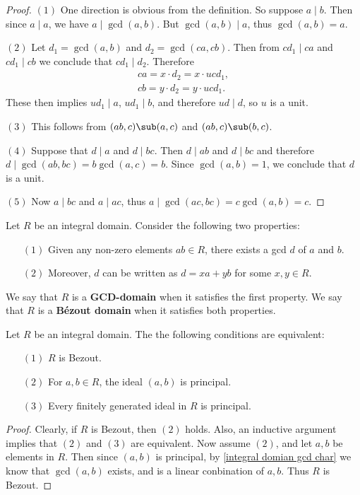 \begin{proof}
$(1)$ One direction is obvious from the definition. So suppose $a\mid b$. Then since $a\mid a$, we have $a\mid\gcd(a,b)$. But $\gcd(a,b)\mid a$, thus $\gcd(a,b)=a$.\par
$(2)$ Let $d_1=\gcd(a,b)$ and $d_2=\gcd(ca,cb)$. Then from $cd_1\mid ca$ and $cd_1\mid cb$ we conclude that $cd_1\mid d_2$. Therefore
\begin{align*}
ca=x\cdot d_2=x\cdot ucd_1,\\
cb=y\cdot d_2=y\cdot ucd_1.
\end{align*}
These then implies $ud_1\mid a$, $ud_1\mid b$, and therefore $ud\mid d$, so $u$ is a unit.\par
$(3)$ This follows from $(ab,c)\sub(a,c)$ and $(ab,c)\sub(b,c)$.\par
$(4)$ Suppose that $d\mid a$ and $d\mid bc$. Then $d\mid ab$ and $d\mid bc$ and therefore $d\mid\gcd(ab,bc)=b\gcd(a,c)=b$. Since $\gcd(a,b)=1$, we conclude that $d$ is a unit.\par
$(5)$ Now $a\mid bc$ and $a\mid ac$, thus $a\mid\gcd(ac,bc)=c\gcd(a,b)=c$.
\end{proof}
\begin{definition}
Let $R$ be an integral domain. Consider the following two properties:
\begin{itemize}
\item[$(1)$] Given any non-zero elements $ab\in R$, there exists a gcd $d$ of $a$ and $b$.
\item[$(2)$] Moreover, $d$ can be written as $d=xa+yb$ for some $x,y\in R$.
\end{itemize}
We say that $R$ is a \textbf{GCD-domain} when it satisfies the first property. We say that $R$ is a \textbf{B\'ezout domain} when it satisfies both properties.
\end{definition}
\begin{proposition}
Let $R$ be an integral domain. The the following conditions are equivalent:
\begin{itemize}
\item[$(1)$] $R$ is Bezout.
\item[$(2)$] For $a,b\in R$, the ideal $(a,b)$ is principal.
\item[$(3)$] Every finitely generated ideal in $R$ is principal.
\end{itemize}
\end{proposition}
\begin{proof}
Clearly, if $R$ is Bezout, then $(2)$ holds. Also, an inductive argument implies that $(2)$ and $(3)$ are equivalent. Now assume $(2)$, and let $a,b$ be elements in $R$. Then since $(a,b)$ is principal, by \cref{integral domian gcd char} we know that $\gcd(a,b)$ exists, and is a linear conbination of $a,b$. Thus $R$ is Bezout.
\end{proof}
